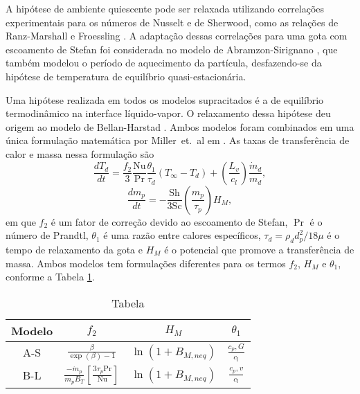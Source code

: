 A hipótese de ambiente quiescente pode ser relaxada utilizando correlações experimentais para os números de Nusselt e de Sherwood, como as relações de Ranz-Marshall \source{} e Froessling \source{}. 
A adaptação dessas correlações para uma gota com escoamento de Stefan foi considerada no modelo de Abramzon-Sirignano \cite{Sirignano1989}, que também modelou o período de aquecimento da partícula, desfazendo-se da hipótese de temperatura de equilíbrio quasi-estacionária.

Uma hipótese realizada em todos os modelos supracitados é a de equilíbrio termodinâmico na interface líquido-vapor.
O relaxamento dessa hipótese deu origem ao modelo de Bellan-Harstad \cite{BellanJ1987}.
Ambos modelos foram combinados em uma única formulação matemática por Miller~et.~al em \cite{MillerR1998}.
As taxas de transferência de calor e massa nessa formulação são
\begin{equation}
    \frac{d T_d}{d t} 
    = 
    \frac{f_2}{3} \frac{\mathrm{Nu}}{\mathrm{Pr}} \frac{\theta_1}{\tau_d} (T_\infty - T_d) +
    \left(\frac{L_v}{c_l}\right)\frac{\dot m_d}{m_d},
\end{equation}
\begin{equation}
    \frac{d m_p}{d t} = - \frac{\mathrm{Sh}}{3\mathrm{Sc}} \left(\frac{m_p}{\tau_p}\right) H_M,
\end{equation}
em que $f_2$ é um fator de correção devido ao escoamento de Stefan, $\Pr$ é o número de Prandtl, $\theta_1$ é uma razão entre calores específicos, $\tau_d=\rho_d d_p^2/18\mu$ é o tempo de relaxamento da gota e $H_M$ é o potencial que promove a transferência de massa.
Ambos modelos tem formulações diferentes para os termos $f_2$, $H_M$ e $\theta_1$, conforme a Tabela \ref{tab:Miller}.
\begin{table}
    \centering
    \caption{Tabela}
    \begin{tabular}{cccc}
        \toprule
        Modelo & $f_2$                                                                             & $H_M$                  & $\theta_1$          \\
        \midrule
        A-S & $\frac{\beta}{\exp(\beta) - 1}$                                                   & $\ln{(1 + B_{M,neq})}$ & $\frac{c_p,G}{c_l}$ \\
        B-L & $\frac{- \dot m_p}{m_p B_T}\left[\frac{3\tau_p \mathrm{Pr}}{\mathrm{Nu}} \right]$ & $\ln{(1 + B_{M,neq})}$ & $\frac{c_p,v}{c_l}$ \\
        \bottomrule
    \end{tabular}
    \label{tab:Miller}
\end{table}